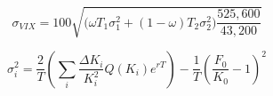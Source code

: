 \documentclass{article}
\begin{document}

\begin{equation*}
	\sigma_{VIX} =  100 \sqrt{ \big( \omega T_1 \sigma_1^2 + (1- \omega) T_2 \sigma_2^2 \big) \frac{525,600}{43,200} }
\end{equation*}


\begin{equation*}
	 \sigma^2_i = \frac{2}{T} \left(\sum_i \frac{\Delta K_i}{K_i^2} Q(K_i) e^{rT} \right) - \frac{1}{T} \left( \frac{F_0}{K_0} - 1 \right)^2
\end{equation*}
\end{document}
